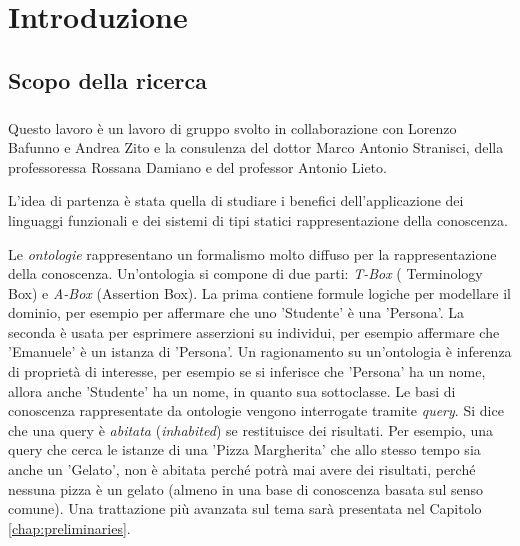 \chapter{Introduzione}

\section{Scopo della ricerca}
\paragraph{} Questo lavoro è un lavoro di gruppo svolto in collaborazione con Lorenzo Bafunno e Andrea Zito e la consulenza del dottor Marco Antonio Stranisci, della professoressa Rossana Damiano e del professor Antonio Lieto.

L'idea di partenza è stata quella di studiare i benefici dell'applicazione dei linguaggi funzionali e dei sistemi di tipi statici
 rappresentazione della conoscenza. 
 
Le \emph{ontologie} rappresentano un formalismo molto diffuso per la rappresentazione della conoscenza. Un'ontologia si compone di due parti: \emph{T-Box} ( Terminology Box) e \emph{A-Box} (Assertion Box). La prima contiene formule logiche per modellare il dominio, per esempio per affermare che uno 'Studente' è una 'Persona'. La seconda è usata per esprimere asserzioni su individui, per esempio affermare che 'Emanuele' è un istanza di 'Persona'. Un ragionamento su un'ontologia è inferenza di proprietà di interesse, per esempio se si inferisce che 'Persona' ha un nome, allora anche 'Studente' ha un nome, in quanto sua sottoclasse. Le basi di conoscenza rappresentate da ontologie vengono interrogate tramite \emph{query}. Si dice che una query è \emph{abitata} (\emph{inhabited}) se  restituisce dei risultati. Per esempio, una query che cerca le istanze di una 'Pizza Margherita' che allo stesso tempo sia anche un 'Gelato', non è abitata perché potrà mai avere dei risultati, perché nessuna pizza è un gelato (almeno in una base di conoscenza basata sul senso comune).  Una trattazione più avanzata sul tema sarà presentata nel Capitolo \ref{chap:preliminaries}.

